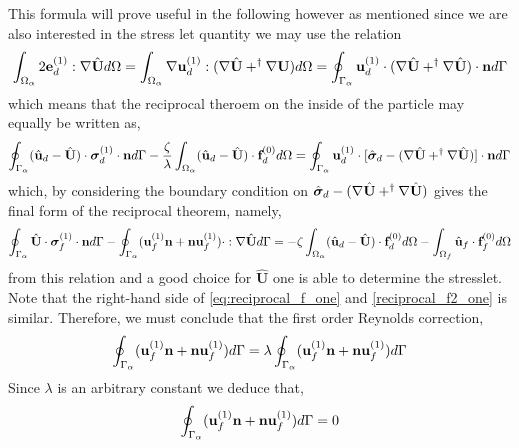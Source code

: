 This formula will prove useful in the following however as mentioned since we are also interested in the stress let quantity we may use the relation 
\begin{align*}
    \int_{\Omega_{\alpha}}  2\textbf{e}_d^{(1)} : \mathbf{\nabla} \hat{\textbf{U}}  d\Omega
    &=\int_{\Omega_{\alpha}}  \mathbf{\nabla} \textbf{u}_d^{(1)} : (\mathbf{\nabla} \hat{\textbf{U}} +^\dagger \mathbf{\nabla} \textbf{U})  d\Omega
    =
    \oint_{\Gamma_{\alpha}}   \textbf{u}_d^{(1)} \cdot (\mathbf{\nabla} \hat{\textbf{U}} + ^\dagger\mathbf{\nabla} \hat{\textbf{U}})  \cdot \textbf{n} d\Gamma\\
\end{align*}
which means that the reciprocal theroem on the inside of the particle may equally be written as, 
\begin{equation*}
    \oint_{\Gamma_{\alpha}}  (\hat{\textbf{u}}_d - \hat{\textbf{U}})\cdot \bm\sigma_d^{(1)} \cdot \textbf{n} d\Gamma
    - \frac{\zeta}{\lambda} \int_{\Omega_{\alpha}} (\hat{\textbf{u}}_d - \hat{\textbf{U}}) \cdot \textbf{f}_d^{(0)} d\Omega
    =
    \oint_{\Gamma_{\alpha}} 
         \textbf{u}_d^{(1)}\cdot[\hat{\bm\sigma}_d  - (\mathbf{\nabla} \hat{\textbf{U}} + ^\dagger\mathbf{\nabla} \hat{\textbf{U}})]\cdot \textbf{n}
     d\Gamma
\end{equation*}
which, by considering the boundary condition on $\hat{\bm\sigma}_d  - (\mathbf{\nabla} \hat{\textbf{U}} + ^\dagger\mathbf{\nabla} \hat{\textbf{U}})$ gives the final form of the reciprocal theorem, namely, 
\begin{equation*}
    \intS{\hat{\textbf{U}}\cdot  \bm\sigma_f^{(1)} \cdot \textbf{n}}
    - \intS{(\textbf{u}_f^{(1)} \textbf{n} + \textbf{n} \textbf{u}_f^{(1)})\cdot :\grad \hat{\textbf{U}} }
    = 
    - \zeta \intO{(\hat{\textbf{u}}_d - \hat{\textbf{U}}) \cdot \textbf{f}_d^{(0)}}
    - \intOf{\hat{\textbf{u}}_f\cdot  \textbf{f}^{(0)}_f}
    \label{eq:reciprocal_f2_one}
\end{equation*}
from this relation and a good choice for $\hat{\textbf{U}}$ one is able to determine the stresslet. 
Note that the right-hand side of \ref{eq:reciprocal_f_one} and \ref{reciprocal_f2_one} is similar. 
Therefore, we must conclude that the first order Reynolds correction,
\begin{equation*}
    \oint_{\Gamma_{\alpha}} (\textbf{u}_f^{(1)} \textbf{n} + \textbf{n} \textbf{u}_f^{(1)}) d\Gamma
    = \lambda \oint_{\Gamma_{\alpha}} (\textbf{u}_f^{(1)} \textbf{n} + \textbf{n} \textbf{u}_f^{(1)}) d\Gamma
\end{equation*}
Since $\lambda$ is an arbitrary constant we deduce that, 
\begin{equation*}
    \oint_{\Gamma_{\alpha}} (\textbf{u}_f^{(1)} \textbf{n} + \textbf{n} \textbf{u}_f^{(1)}) d\Gamma= 0
\end{equation*}


